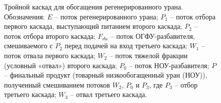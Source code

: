 \begin{figure}[ht]
    \caption{Тройной каскад для обогащения регенерированного урана. Обозначения: $E$ -- поток регенерированного урана; $P_1$ -- поток отбора первого каскада, выступающий питанием второго каскада; $P_2$ -- поток отбора второго каскада; $F_{du}$ -- поток ОГФУ-разбавителя, смешиваемого с $P_2$ перед подачей на вход третьего каскада; $W_1$ -- поток отвала первого каскада; $W_2$ -- поток тяжелой фракции (условный «отвал») второго каскада; $P_0$ -- поток НОУ-разбавителя; $P$ -- финальный продукт (товарный низкообогащенный уран (НОУ)), полученный смешиванием потоков $W_2$, $P_0$ и $P_3$, где $P_3$ -- отбор третьего каскада; $W_3$ -- отвал третьего каскада.}\label{p2_withDepU}
\end{figure}

